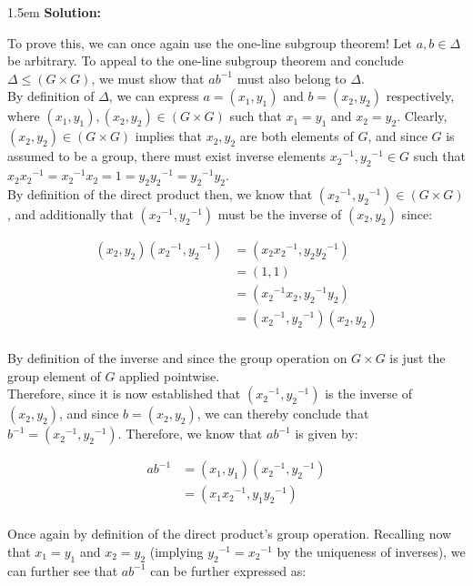 \documentclass{article}
\newenvironment{solution}{
	\vspace{.5em}
	\par
	\begin{adjustwidth}{1.5em}{}
	\textbf{{Solution:}}
	\par
	\vspace{.5em}
}{
	\vspace{1em}
	\end{adjustwidth}
	\setcounter{step}{0}
}
\newcounter{step}
\begin{document}
\begin{solution}
	To prove this, we can once again use the one-line subgroup theorem! Let $a, b \in \Delta$ be arbitrary. To appeal to the one-line subgroup theorem and conclude $\Delta \le (G \times G)$, we must show that $ab^{-1}$ must also belong to $\Delta$. \\

	By definition of $\Delta$, we can express $a = (x_1, y_1)$ and $b = (x_2, y_2)$ respectively, where $(x_1, y_1), (x_2, y_2) \in (G \times G)$ such that $x_1 = y_1$ and $x_2 = y_2$. Clearly, $(x_2, y_2) \in (G \times G)$ implies that $x_2, y_2$ are both elements of $G$, and since $G$ is assumed to be a group, there must exist inverse elements ${x_2}^{-1}, {y_2}^{-1} \in G$ such that $x_2{x_2}^{-1} = {x_2}^{-1}{x_2} = 1 = {y_2}{y_2}^{-1} = {y_2}^{-1}{y_2}$. \\

	By definition of the direct product then, we know that $({x_2}^{-1}, {y_2}^{-1}) \in (G \times G)$, and additionally that $({x_2}^{-1}, {y_2}^{-1})$ must be the inverse of $(x_2, y_2)$ since:

	\begin{align*}
		(x_2, y_2)({x_2}^{-1}, {y_2}^{-1}) &= (x_2{x_2}^{-1}, {y_2}{y_2}^{-1}) \\
		&= (1, 1) \\
		&= ({x_2}^{-1}x_2, {y_2}^{-1}{y_2}) \\
		&= ({x_2}^{-1}, {y_2}^{-1})(x_2, y_2) \\
	\end{align*}

	By definition of the inverse and since the group operation on $G \times G$ is just the group element of $G$ applied pointwise. \\

	Therefore, since it is now established that $({x_2}^{-1}, {y_2}^{-1})$ is the inverse of $(x_2, y_2)$, and since $b = (x_2, y_2)$, we can thereby conclude that $b^{-1} = ({x_2}^{-1}, {y_2}^{-1})$. Therefore, we know that $ab^{-1}$ is given by:

	\begin{align*}
		ab^{-1} &= (x_1, y_1)({x_2}^{-1}, {y_2}^{-1}) \\
		&= ({x_1}{x_2}^{-1}, {y_1}{y_2}^{-1}) \\
	\end{align*}

	Once again by definition of the direct product's group operation. Recalling now that $x_1 = y_1$ and $x_2 = y_2$ (implying ${y_2}^{-1} = {x_2}^{-1}$ by the uniqueness of inverses), we can further see that $ab^{-1}$ can be further expressed as:


\end{solution}
\end{document}
